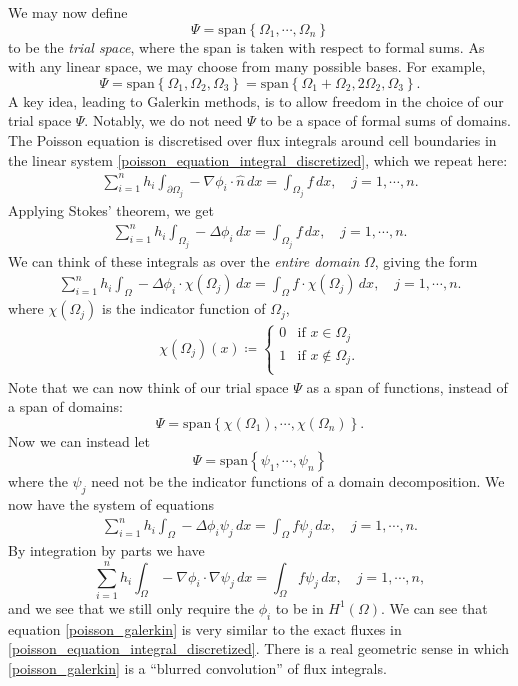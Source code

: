\documentclass[11pt,a4paper]{memoir}
\newcommand{\om}{{\Omega}}
\newcommand{\pom}{{\partial\Omega}}
\begin{document}
We may now define
    $$\Psi = \text{span}\left\{\Omega_1,\cdots,\Omega_n\right\}$$
to be the \textit{trial space}, where the span is taken with respect to formal sums. As with any linear space,
we may choose from many possible bases. For example,
    $$\Psi = \text{span}\left\{\Omega_1, \Omega_2, \Omega_3\right\} =
    \text{span}\left\{\Omega_1 + \Omega_2, 2\Omega_2, \Omega_3\right\}.$$
A key idea, leading to Galerkin methods, is to allow freedom in the choice of our trial space $\Psi$.
Notably, we do not need $\Psi$ to be a space of formal sums of domains.
The Poisson equation is discretised over flux integrals around cell boundaries in the linear system \eqref{poisson_equation_integral_discretized},
which we repeat here:
\begin{align*}
    \sum_{i=1}^n h_i\int_{\pom_j} -\nabla \phi_i \cdot \hat{n}\,dx = \int_{\om_j} f\,dx,\quad j=1,\cdots,n.
\end{align*}
Applying Stokes' theorem, we get
\begin{align*}
    \sum_{i=1}^n h_i\int_{\om_j} -\Delta \phi_i \,dx = \int_{\om_j} f\,dx,\quad j=1,\cdots,n.
\end{align*}
We can think of these integrals as over the \textit{entire domain} $\Omega$, giving the form
\begin{align*}
    \sum_{i=1}^n h_i\int_{\om} -\Delta \phi_i\cdot \chi(\om_j)\,dx = \int_{\om} f\cdot\chi(\om_j)\,dx,\quad j=1,\cdots,n.
\end{align*}
where $\chi(\om_j)$ is the indicator function of $\om_j$,
\begin{align*}
    \chi(\om_j)(x) \coloneqq \left\{\begin{array}{lr}
        0 &\text{if $x \in \om_j$}\\
        1 &\text{if $x \notin \om_j$.}\\
        \end{array}\right.
\end{align*}
Note that we can now think of our trial space $\Psi$ as a span of functions, instead of a span of domains:
    $$\Psi = \text{span}\left\{\chi(\Omega_1),\cdots,\chi(\Omega_n)\right\}.$$
Now we can instead let
    $$\Psi = \text{span}\left\{\psi_1,\cdots,\psi_n\right\}$$
where the $\psi_j$
need not be the indicator functions of a domain decomposition. We now have the system of equations
\begin{align*}
    \sum_{i=1}^n h_i\int_{\om} -\Delta \phi_i \psi_j\,dx = \int_{\om} f\psi_j\,dx,\quad j=1,\cdots,n.
\end{align*}
By integration by parts we have
\begin{equation}\label{poisson_galerkin}
    \sum_{i=1}^n h_i\int_{\om} -\nabla \phi_i \cdot \nabla \psi_j\,dx = \int_{\om} f\psi_j\,dx,\quad j=1,\cdots,n,
\end{equation}
and we see that we still only require the $\phi_i$ to be in $H^1(\Omega)$.
We can see that equation \eqref{poisson_galerkin} is very similar to the exact fluxes in \eqref{poisson_equation_integral_discretized}.
There is a real geometric sense in which \eqref{poisson_galerkin} is a ``blurred convolution'' of flux integrals.
\end{document}
